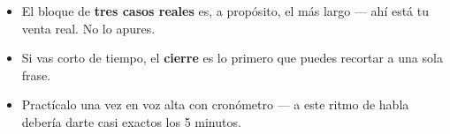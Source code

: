\documentclass[12pt,letterpaper]{article}
\begin{document}
\begin{tcolorbox}[
  enhanced, breakable,
  colback=ssbg, colframe=ssgray!40,
  arc=3pt, boxrule=0.8pt,
  left=9pt, right=9pt, top=5pt, bottom=5pt,
  title={\bfseries\sffamily\color{ssgray} Consejos rápidos de ritmo},
  colbacktitle=ssbg, coltitle=ssgray, boxed title style={boxrule=0pt}
]
\begin{itemize}[leftmargin=1.1em, itemsep=0.12em, topsep=0.1em]
  \item El bloque de \textbf{tres casos reales} es, a propósito, el más largo --- ahí está tu venta real. No lo apures.
  \item Si vas corto de tiempo, el \textbf{cierre} es lo primero que puedes recortar a una sola frase.
  \item Practícalo una vez en voz alta con cronómetro --- a este ritmo de habla debería darte casi exactos los 5 minutos.
\end{itemize}
\end{tcolorbox}
\end{document}
